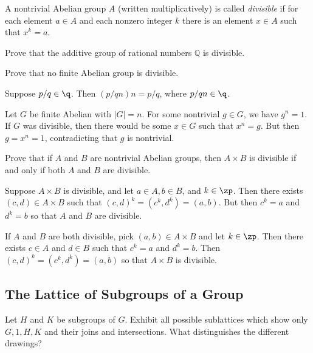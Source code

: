 \begin{specialexercise}\label{ex2.4.19} 
    A nontrivial Abelian group $A$ (written multiplicatively) is called \emph{divisible} if for each element $a\in A$ and each nonzero integer $k$ there is an element $x\in A$ such that $x^k=a$.  
    \begin{subproblems}
        \item Prove that the additive group of rational numbers $\mathbb{Q}$ is divisible.
        \item Prove that no finite Abelian group is divisible.
    \end{subproblems}
\end{specialexercise}

\begin{solalph}
    \item Suppose $p/q \in \q$. Then $(p/qn)n = p/q$, where $p/qn \in \q$.
    \item Let $G$ be finite Abelian with $|G| = n$. For some nontrivial $g \in G$, we have $g^n = 1$. If $G$ was divisible, then there would be some $x \in G$ such that $x^n = g$. But then $g = x^n = 1$, contradicting that $g$ is nontrivial.
\end{solalph}

\begin{exercise}\label{ex2.4.20}
    Prove that if $A$ and $B$ are nontrivial Abelian groups, then $A\times B$ is divisible if and only if both $A$ and $B$ are divisible.
\end{exercise}

\begin{sol}
    Suppose $A \times B$ is divisible, and let $a \in A, b \in B$, and $k \in \zp$. Then there exists $(c, d) \in A \times B$ such that $(c, d)^k = (c^k, d^k) = (a, b)$. But then $c^k = a$ and $d^k = b$ so that $A$ and $B$ are divisible.
    
    If $A$ and $B$ are both divisible, pick $(a, b) \in A \times B$ and let $k \in \zp$. Then there exists $c \in A$ and $d \in B$ such that $c^k = a$ and $d^k = b$. Then $(c, d)^k = (c^k, d^k) = (a, b)$ so that $A \times B$ is divisible.
\end{sol}

\newpage

\subsection{The Lattice of Subgroups of a Group}

\begin{exercise}\label{ex2.5.1}
    Let $H$ and $K$ be subgroups of $G$. Exhibit all possible sublattices which show only $G, 1, H, K$ and their joins and intersections. What distinguishes the different drawings?
\end{exercise}


